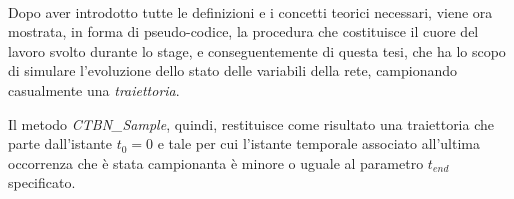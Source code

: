   \paragraph{}
  Dopo aver introdotto tutte le definizioni e i concetti teorici necessari, viene ora mostrata,
  in forma di pseudo-codice, la procedura che costituisce il cuore del lavoro svolto durante lo stage,
  e conseguentemente di questa tesi, che ha lo scopo di simulare l'evoluzione dello stato delle variabili della rete,
  campionando casualmente una \textit{traiettoria}.

  \begin{algorithm}
    \DontPrintSemicolon
    
    \label{alg:ctbn_sample}
  \end{algorithm}

  Il metodo \textit{CTBN\_Sample}, quindi, restituisce come risultato una traiettoria che parte dall'istante $t_0 = 0$
  e tale per cui l'istante temporale associato all'ultima occorrenza che è stata campionanta è minore o uguale al parametro $t_{end}$
  specificato.\

